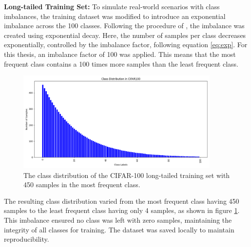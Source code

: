 

\textbf{Long-tailed Training Set:} To simulate real-world scenarios with class imbalances, the training dataset was modified to introduce an exponential imbalance across the 100 classes. Following the procedure of \cite{cao2019learningimbalanceddatasetslabeldistributionaware}, the imbalance was created using exponential decay. Here, the number of samples per class decreases exponentially, controlled by the imbalance factor, following equation \eqref{eq:exp}. For this thesis, an imbalance factor of 100 was applied. This means that the most frequent class contains a 100 times more samples than the least frequent class. 

\begin{figure}[h!]
    \centering
    \includegraphics[width=0.9\textwidth]{Images/Plots/cifar100_train_450_imb.png}
    \caption{The class distribution of the CIFAR-100 long-tailed training set with 450 samples in the most frequent class.}
    \label{fig:cifar100_train_450_imb}
\end{figure}

The resulting class distribution varied from the most frequent class having 450 samples to the least frequent class having only 4 samples, as shown in figure \ref{fig:cifar100_train_450_imb}. This imbalance ensured no class was left with zero samples, maintaining the integrity of all classes for training. The dataset was saved locally to maintain reproducibility.


